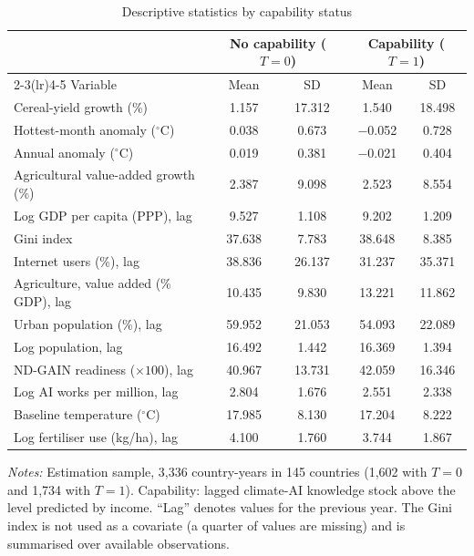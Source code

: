 \begin{table}[t]
\centering
\caption{Descriptive statistics by capability status}\label{tab:desc}
\small
\begin{tabular}{lcccc}
\toprule
 & \multicolumn{2}{c}{No capability ($T=0$)} & \multicolumn{2}{c}{Capability ($T=1$)} \\
\cmidrule(lr){2-3}\cmidrule(lr){4-5}
Variable & Mean & SD & Mean & SD \\
\midrule
Cereal-yield growth (\%) & 1.157 & 17.312 & 1.540 & 18.498 \\
Hottest-month anomaly ($^{\circ}$C) & 0.038 & 0.673 & $-$0.052 & 0.728 \\
Annual anomaly ($^{\circ}$C) & 0.019 & 0.381 & $-$0.021 & 0.404 \\
Agricultural value-added growth (\%) & 2.387 & 9.098 & 2.523 & 8.554 \\
Log GDP per capita (PPP), lag & 9.527 & 1.108 & 9.202 & 1.209 \\
Gini index & 37.638 & 7.783 & 38.648 & 8.385 \\
Internet users (\%), lag & 38.836 & 26.137 & 31.237 & 35.371 \\
Agriculture, value added (\% GDP), lag & 10.435 & 9.830 & 13.221 & 11.862 \\
Urban population (\%), lag & 59.952 & 21.053 & 54.093 & 22.089 \\
Log population, lag & 16.492 & 1.442 & 16.369 & 1.394 \\
ND-GAIN readiness ($\times100$), lag & 40.967 & 13.731 & 42.059 & 16.346 \\
Log AI works per million, lag & 2.804 & 1.676 & 2.551 & 2.338 \\
Baseline temperature ($^{\circ}$C) & 17.985 & 8.130 & 17.204 & 8.222 \\
Log fertiliser use (kg/ha), lag & 4.100 & 1.760 & 3.744 & 1.867 \\
\bottomrule
\end{tabular}
\begin{minipage}{0.95\textwidth}\footnotesize\smallskip
\emph{Notes:} Estimation sample, 3,336 country-years in 145 countries (1,602 with $T=0$ and 1,734 with $T=1$). Capability: lagged climate-AI knowledge stock above the level predicted by income. ``Lag'' denotes values for the previous year. The Gini index is not used as a covariate (a quarter of values are missing) and is summarised over available observations.
\end{minipage}
\end{table}
